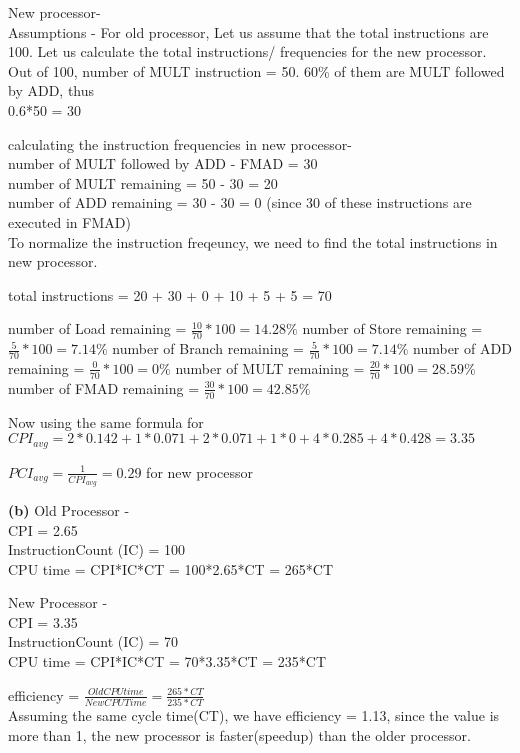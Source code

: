 \documentclass[11pt]{article}
\renewcommand\part[1]{\vspace{.10in}\textbf{(#1)}}
\begin{document}
New processor-\\
Assumptions - For old processor, Let us assume that the total instructions are 100.  
Let us calculate the total instructions/ frequencies for the new processor.\\ 
Out of 100, number of MULT instruction = 50. 60\% of them are MULT followed by ADD, thus \\
0.6*50 = 30

calculating the instruction frequencies in new processor-\\
number of MULT followed by ADD - FMAD = 30\\
number of MULT remaining = 50 - 30 = 20\\
number of ADD  remaining = 30 - 30 = 0 (since 30 of these instructions are executed in FMAD)\\

To normalize the instruction freqeuncy, we need to find the total instructions in new processor. 

total instructions  = 20 + 30 + 0 + 10 + 5 + 5 = 70 

number of Load remaining = $\frac{10}{70}*100 = 14.28\%$ 
number of Store remaining = $\frac{5}{70}*100 = 7.14\%$ 
number of Branch remaining = $\frac{5}{70}*100 = 7.14\%$ 
number of ADD remaining = $\frac{0}{70}*100 = 0\% $
number of MULT remaining = $\frac{20}{70}*100 = 28.59\% $
number of FMAD remaining = $\frac{30}{70}*100 = 42.85\% $

Now using the same formula for $CPI_{avg} = 2*0.142+1*0.071+2*0.071+1*0+4*0.285+4*0.428 = 3.35$

$PCI_{avg} = \frac{1}{CPI_{avg}} = 0.29$ for new processor

\part{b}
Old Processor - \\
CPI = 2.65\\
InstructionCount (IC) = 100\\
CPU time = CPI*IC*CT = 100*2.65*CT = 265*CT

New Processor - \\
CPI = 3.35\\
InstructionCount (IC) = 70\\
CPU time = CPI*IC*CT = 70*3.35*CT = 235*CT

efficiency = $\frac{Old CPU time}{New CPU Time} = \frac{265*CT}{235*CT}$\\
Assuming the same cycle time(CT), we have efficiency = 1.13, since the value is more than 1, the new processor is faster(speedup) than the older processor.
\end{document}
